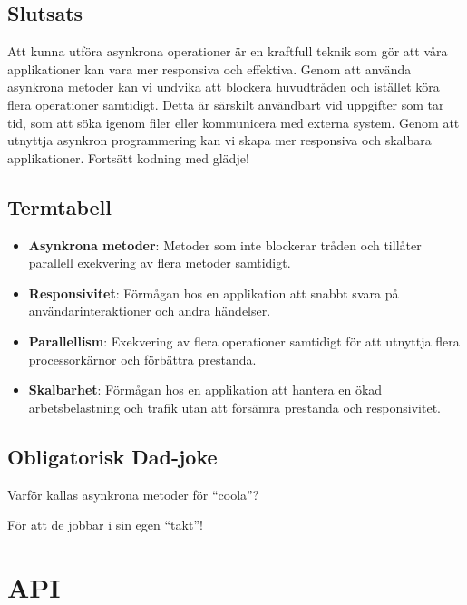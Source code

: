 \hypertarget{slutsats}{%
\subsection{Slutsats}\label{slutsats}}

Att kunna utföra asynkrona operationer är en kraftfull teknik som gör
att våra applikationer kan vara mer responsiva och effektiva. Genom att
använda asynkrona metoder kan vi undvika att blockera huvudtråden och
istället köra flera operationer samtidigt. Detta är särskilt användbart
vid uppgifter som tar tid, som att söka igenom filer eller kommunicera
med externa system. Genom att utnyttja asynkron programmering kan vi
skapa mer responsiva och skalbara applikationer. Fortsätt kodning med
glädje!

\hypertarget{termtabell}{%
\subsection{Termtabell}\label{termtabell}}

\begin{itemize}
\tightlist
\item
  \textbf{Asynkrona metoder}: Metoder som inte blockerar tråden och
  tillåter parallell exekvering av flera metoder samtidigt.
\item
  \textbf{Responsivitet}: Förmågan hos en applikation att snabbt svara
  på användarinteraktioner och andra händelser.
\item
  \textbf{Parallellism}: Exekvering av flera operationer samtidigt för
  att utnyttja flera processorkärnor och förbättra prestanda.
\item
  \textbf{Skalbarhet}: Förmågan hos en applikation att hantera en ökad
  arbetsbelastning och trafik utan att försämra prestanda och
  responsivitet.
\end{itemize}

\hypertarget{obligatorisk-dad-joke}{%
\subsection{Obligatorisk Dad-joke}\label{obligatorisk-dad-joke}}

Varför kallas asynkrona metoder för ``coola''?

För att de jobbar i sin egen ``takt''!

\hypertarget{api}{%
\section{API}\label{api}}

